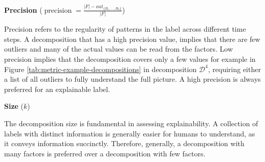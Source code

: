 \textbf{Precision} ($\operatorname{precision} = \frac{|F| - out_{\{B_1,\dots,B_k\}}}{|F|}$)

Precision refers to the regularity of patterns in the label across different time steps.
A decomposition that has a high precision value, implies that there are few outliers and many of the actual values can be read from the factors.
Low precision implies that the decomposition covers only a few values for example in Figure \ref{tab:metric-example-decompositions} in decomposition $\mathcal{D}^4$, requiring either a list of all outliers to fully understand the full picture.
A high precision is always preferred for an explainable label. 

\textbf{Size} ($k$)

The decomposition size is fundamental in assessing explainability.
A collection of labels with distinct information is generally easier for humans to understand, as it conveys information succinctly.
Therefore, generally, a decomposition with many factors is preferred over a decomposition with few factors.

